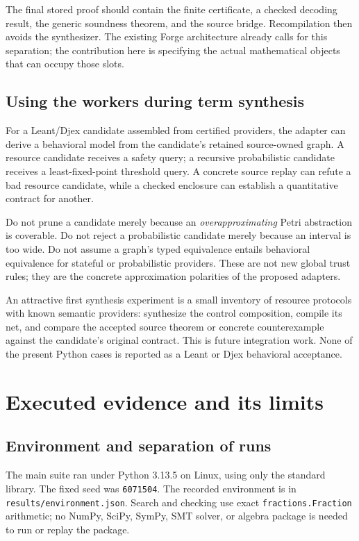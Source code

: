 \documentclass[11pt,a4paper]{article}
\theoremstyle{definition}\newtheorem{definition}[theorem]{Definition}
\theoremstyle{remark}\newtheorem{remark}[theorem]{Remark}
\newcommand{\code}[1]{\nolinkurl{#1}}
\begin{document}
The final stored proof should contain the finite certificate, a checked decoding result, the generic soundness theorem, and the source bridge. Recompilation then avoids the synthesizer. The existing Forge architecture already calls for this separation; the contribution here is specifying the actual mathematical objects that can occupy those slots.

\subsection{Using the workers during term synthesis}
For a Leant/Djex candidate assembled from certified providers, the adapter can derive a behavioral model from the candidate's retained source-owned graph. A resource candidate receives a safety query; a recursive probabilistic candidate receives a least-fixed-point threshold query. A concrete source replay can refute a bad resource candidate, while a checked enclosure can establish a quantitative contract for another.

Do not prune a candidate merely because an \emph{overapproximating} Petri abstraction is coverable. Do not reject a probabilistic candidate merely because an interval is too wide. Do not assume a graph's typed equivalence entails behavioral equivalence for stateful or probabilistic providers. These are not new global trust rules; they are the concrete approximation polarities of the proposed adapters.

An attractive first synthesis experiment is a small inventory of resource protocols with known semantic providers: synthesize the control composition, compile its net, and compare the accepted source theorem or concrete counterexample against the candidate's original contract. This is future integration work. None of the present Python cases is reported as a Leant or Djex behavioral acceptance.



\section{Executed evidence and its limits}
\label{sec:evidence}
\subsection{Environment and separation of runs}
The main suite ran under Python 3.13.5 on Linux, using only the standard library. The fixed seed was \code{6071504}. The recorded environment is in \code{results/environment.json}. Search and checking use exact \code{fractions.Fraction} arithmetic; no NumPy, SciPy, SymPy, SMT solver, or algebra package is needed to run or replay the package.
\end{document}
